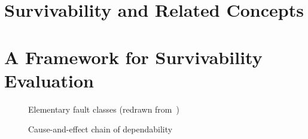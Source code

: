 \documentclass[onecolumn,conference]{IEEEtran}
\begin{document}
    \section{Survivability and Related Concepts} \label{sec:rlwork}


    \section{A Framework for Survivability Evaluation} \label{sec:fram}

    \begin{figure}[htbp]
        \centering
        \caption{Elementary fault classes (redrawn from~\cite{b1})}
        \label{fig:1}
    \end{figure}


    \begin{figure}[htbp]
        \centering
        \caption{Cause-and-effect chain of dependability}
        \label{fig:2}
    \end{figure}
\end{document}
